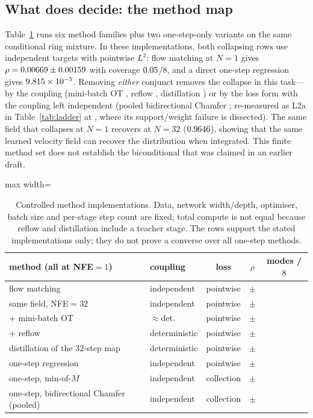 \documentclass{article}
\newcommand{\tblstyle}[1]{%
  \begin{adjustbox}{max width=\columnwidth}%
  \footnotesize\setlength{\tabcolsep}{4pt}%
  #1%
  \end{adjustbox}}
\theoremstyle{plain}
\begin{document}
\subsection{What does decide: the method map}
\label{sec:exmap}

Table~\ref{tab:map} runs six method families plus two one-step-only variants on the
same conditional ring mixture. In these implementations, both collapsing rows use
independent targets with pointwise $L^2$: flow matching at $N=1$ gives
$\rho=0.00669\pm0.00159$ with coverage $0.05$/$8$, and a direct
one-step regression gives $9.815\times 10^{-5}$. Removing \emph{either} conjunct removes the
collapse in this task---by the coupling (mini-batch OT \MMOtOneRho, reflow \MMReflowOneRho,
distillation \MMDistillOneRho) or by the loss form with the coupling left independent
(pooled bidirectional Chamfer \MMChamferRho; re-measured as L2a in
Table~\ref{tab:ladder} at \LLChamferPooledRho, where its support/weight failure is
dissected). The same field that collapses at $N=1$ recovers at
$N=32$ ($0.9646$), showing that the same learned velocity field can recover the
distribution when integrated. This finite method set does not establish the biconditional
that was claimed in an earlier draft.

\begin{table}[t]
\centering
\caption{Controlled method implementations. Data, network width/depth, optimiser, batch
size and per-stage step count are fixed; total compute is not equal because reflow and
distillation include a teacher stage. The rows support the stated implementations only;
they do not prove a converse over all one-step methods.}
\label{tab:map}
\vskip 0.05in
\tblstyle{
\begin{tabular}{llccc}
\toprule
method (all at NFE$=1$) & coupling & loss & $\rho$ & modes / $8$ \\
\midrule
flow matching & independent & pointwise & \MMIndepOneRho{}$\pm$\MMIndepOneStd & \MMIndepOneCov \\
\quad same field, NFE$=32$ & independent & pointwise & \MMIndepManyRho{}$\pm$\MMIndepManyStd & \MMIndepManyCov \\
\quad + mini-batch OT & $\approx$det. & pointwise & \MMOtOneRho{}$\pm$\MMOtOneStd & \MMOtOneCov \\
\quad + reflow & deterministic & pointwise & \MMReflowOneRho{}$\pm$\MMReflowOneStd & \MMReflowOneCov \\
distillation of the $32$-step map & deterministic & pointwise & \MMDistillOneRho{}$\pm$\MMDistillOneStd & \MMDistillOneCov \\
one-step regression & independent & pointwise & \MMLtwoOneRho{}$\pm$\MMLtwoOneStd & \MMLtwoOneCov \\
one-step, min-of-$M$ & independent & collection & \MMMinMOneRho{}$\pm$\MMMinMOneStd & \MMMinMOneCov \\
one-step, bidirectional Chamfer (pooled) & independent & collection & \MMChamferRho{}$\pm$\MMChamferStd & \MMChamferCov \\
\bottomrule
\end{tabular}}
\end{table}
\end{document}
